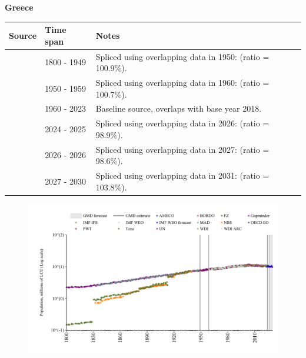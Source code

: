 \documentclass[12pt,a4paper,landscape]{article}
\begin{document}
\begin{adjustbox}{max totalsize={\paperwidth}{\paperheight},center}
\begin{minipage}[t][\textheight][t]{\textwidth}
\vspace*{0.5cm}
{}
\begin{center}
{\Large\bfseries Greece}
\end{center}
\vspace{0.5cm}
\begin{table}[H]
\centering
\small
\begin{tabular}{|l|l|l|}
\hline
\textbf{Source} & \textbf{Time span} & \textbf{Notes} \\
\hline
\rowcolor{white}\cite{Gapminder}& 1800 - 1949 &Spliced using overlapping data in 1950: (ratio = 100.9\%).\\
\rowcolor{lightgray}\cite{IMF_IFS}& 1950 - 1959 &Spliced using overlapping data in 1960: (ratio = 100.7\%).\\
\rowcolor{white}\cite{WDI}& 1960 - 2023 &Baseline source, overlaps with base year 2018.\\
\rowcolor{lightgray}\cite{OECD_EO}& 2024 - 2025 &Spliced using overlapping data in 2026: (ratio = 98.9\%).\\
\rowcolor{white}\cite{AMECO}& 2026 - 2026 &Spliced using overlapping data in 2027: (ratio = 98.6\%).\\
\rowcolor{lightgray}\cite{Gapminder}& 2027 - 2030 &Spliced using overlapping data in 2031: (ratio = 103.8\%).\\
\hline
\end{tabular}
\end{table}
\begin{figure}[H]
\centering
\includegraphics[width=\textwidth,height=0.6\textheight,keepaspectratio]{graphs/GRC_pop.pdf}
\end{figure}
\end{minipage}
\end{adjustbox}
\end{document}
